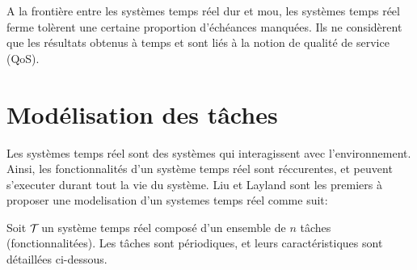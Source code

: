 A la frontière entre les systèmes temps réel dur et mou, les systèmes
temps réel ferme tolèrent une certaine proportion d’échéances
manquées. Ils ne considèrent que les résultats obtenus à temps et sont
liés à la notion de qualité de service (QoS).

\section{Modélisation des tâches}
Les systèmes temps réel sont des systèmes qui interagissent avec
l'environnement. Ainsi, les fonctionnalités d'un système temps réel
sont réccurentes, et peuvent s'executer durant tout la vie du
système. Liu et Layland \cite{LL73} sont les premiers à proposer une
modelisation d'un systemes temps réel comme suit:

\noindent Soit $\mathcal{T}_{}$ un système temps réel composé d’un
ensemble de $n$ tâches (fonctionnalitées). Les t\^aches sont
périodiques, et leurs caractéristiques sont détaillées ci-dessous.
